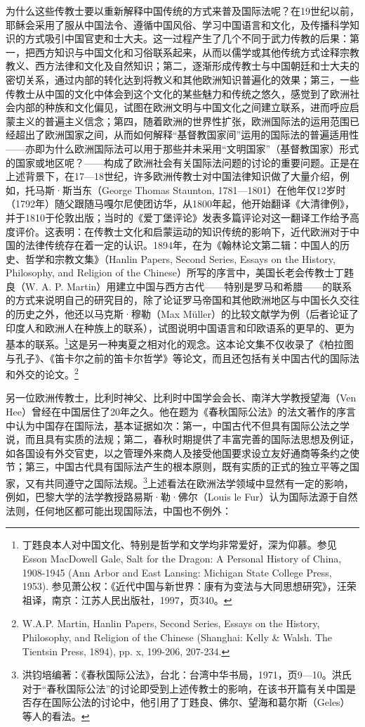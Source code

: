 \documentclass[a4paper, 12pt, openright]{ctexbook}
\begin{document}
为什么这些传教士要以重新解释中国传统的方式来普及国际法呢？在19世纪以前，耶稣会采用了服从中国法令、遵循中国风俗、学习中国语言和文化，及传播科学知识的方式吸引中国官吏和士大夫。这一过程产生了几个不同于武力传教的后果：第一，把西方知识与中国文化和习俗联系起来，从而以儒学或其他传统方式诠释宗教教义、西方法律和文化及自然知识；第二，逐渐形成传教士与中国朝廷和士大夫的密切关系，通过内部的转化达到将教义和其他欧洲知识普遍化的效果；第三，一些传教士从中国的文化中体会到这个文化的某些魅力和传统之悠久，感觉到了欧洲社会内部的种族和文化偏见，试图在欧洲文明与中国文化之间建立联系，进而呼应启蒙主义的普遍主义信念；第四，随着欧洲的世界性扩张，欧洲国际法的运用范围已经超出了欧洲国家之间，从而如何解释“基督教国家间”运用的国际法的普遍适用性——亦即为什么欧洲国际法可以用于那些并未采用“文明国家”（基督教国家）形式的国家或地区呢？——构成了欧洲社会有关国际法问题的讨论的重要问题。正是在上述背景下，在17—18世纪，许多欧洲传教士对中国法律知识做了大量介绍，例如，托马斯·斯当东（George Thomas Staunton, 1781—1801）在他年仅12岁时（1792年）随父跟随马嘎尔尼使团访华，从1800年起，他开始翻译《大清律例》，并于1810于伦敦出版；当时的《爱丁堡评论》发表多篇评论对这一翻译工作给予高度评价。这表明：在传教士文化和启蒙运动的知识传统的影响下，近代欧洲对于中国的法律传统存在着一定的认识。1894年，在为《翰林论文第二辑：中国人的历史、哲学和宗教文集》（Hanlin Papers, Second Series, Essays on the History, Philosophy, and Religion of the Chinese）所写的序言中，美国长老会传教士丁韪良（W. A. P. Martin）用建立中国与西方古代——特别是罗马和希腊——的联系的方式来说明自己的研究目的，除了论证罗马帝国和其他欧洲地区与中国长久交往的历史之外，他还以马克斯·穆勒（Max Müller）的比较文献学为例（后者论证了印度人和欧洲人在种族上的联系），试图说明中国语言和印欧语系的更早的、更为基本的联系。\footnote{丁韪良本人对中国文化、特别是哲学和文学均非常爱好，深为仰慕。参见Esson MacDowell Gale, Salt for the Dragon: A Personal History of China, 1908-1945 (Ann Arbor and East Lansing: Michigan State College Press, 1953). 参见萧公权：《近代中国与新世界：康有为变法与大同思想研究》，汪荣祖译，南京：江苏人民出版社，1997，页340。}这是另一种夷夏之相对化的观念。这本论文集不仅收录了《柏拉图与孔子》、《笛卡尔之前的笛卡尔哲学》等论文，而且还包括有关中国古代的国际法和外交的论文。\footnote{W.A.P. Martin, Hanlin Papers, Second Series, Essays on the History, Philosophy, and Religion of the Chinese (Shanghai: Kelly \& Walsh. The Tientsin Press, 1894), pp. x, 199-206, 207-234.}

另一位欧洲传教士，比利时神父、比利时中国学会会长、南洋大学教授望海（Ven Hee）曾经在中国居住了20年之久。他在题为《春秋国际公法》的法文著作的序言中认为中国存在国际法，基本证据如次：第一，中国古代不但具有国际公法之学说，而且具有实质的法规；第二，春秋时期提供了丰富完善的国际法思想及例证，如各国设有外交官吏，以之管理外来商人及接受他国要求设立友好通商等条约之使节；第三，中国古代具有国际法产生的根本原则，既有实质的正式的独立平等之国家，又有共同遵守之国际法规。\footnote{洪钧培编著：《春秋国际公法》，台北：台湾中华书局，1971，页9—10。洪氏对于“春秋国际公法”的讨论即受到上述传教士的影响，在该书开篇有关中国是否存在国际公法的讨论中，他引用了丁韪良、佛尔、望海和葛尔斯（Geles）等人的看法。}上述看法在欧洲法学领域中显然有一定的影响，例如，巴黎大学的法学教授路易斯·勒·佛尔（Louis le Fur）认为国际法源于自然法则，任何地区都可能出现国际法，中国也不例外：
\end{document}
